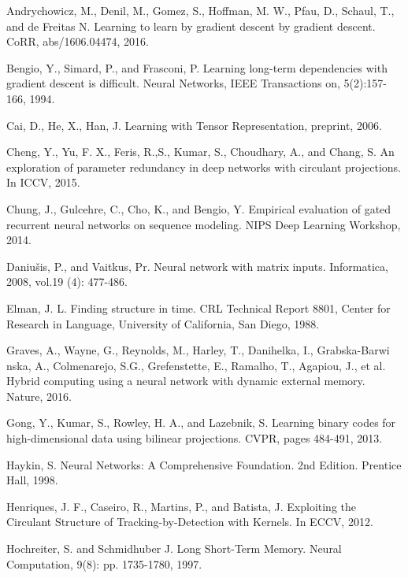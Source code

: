 \documentclass[a4paper,11pt]{article}
\begin{document}
\begin{thebibliography}{1}



 Andrychowicz, M.,  Denil, M., Gomez, S., Hoffman, M. W., Pfau, D., Schaul, T., and de Freitas N.  Learning to learn by gradient descent by gradient descent. CoRR, abs/1606.04474, 2016.

 Bengio,  Y.,  Simard,  P.,  and  Frasconi, P. Learning long-term dependencies with gradient descent is difficult. Neural Networks, IEEE Transactions on, 5(2):157-166, 1994.


 Cai, D., He, X., Han, J. Learning with Tensor Representation, preprint, 2006.

 Cheng, Y., Yu, F. X., Feris, R.,S., Kumar, S., Choudhary, A., and Chang, S.  An exploration of parameter redundancy in deep networks with circulant projections. In
ICCV, 2015.


 Chung, J., Gulcehre, C., Cho, K., and Bengio, Y. Empirical evaluation of gated recurrent neural networks on sequence modeling. NIPS Deep Learning Workshop, 2014.

 Daniu\v{s}is, P., and Vaitkus, Pr. Neural network with matrix inputs. Informatica, 2008, vol.19 (4): 477-486.


 Elman, J. L. Finding structure in time.  CRL Technical Report 8801, Center for Research in Language, University
of California, San Diego, 1988.

  Graves, A., Wayne, G., Reynolds, M.,  Harley, T., Danihelka, I., Grabska-Barwi
 nska, A., Colmenarejo, S.G., Grefenstette, E., Ramalho, T., Agapiou, J., et al. Hybrid computing using a neural network with dynamic external memory. Nature, 2016.
 


  Gong, Y., Kumar, S., Rowley, H. A., and Lazebnik, S. Learning binary codes for high-dimensional data using bilinear projections. CVPR, pages 484-491, 2013.



 Haykin, S. Neural Networks: A Comprehensive Foundation. 2nd Edition. Prentice Hall, 1998.


 Henriques,  J. F.,  Caseiro, R.,  Martins, P.,  and Batista, J.   Exploiting the Circulant Structure of Tracking-by-Detection with Kernels.   In ECCV, 2012.


 Hochreiter, S.  and  Schmidhuber J. Long  Short-Term  Memory. Neural  Computation, 9(8): pp. 1735-1780, 1997.




\end{thebibliography}
\end{document}
